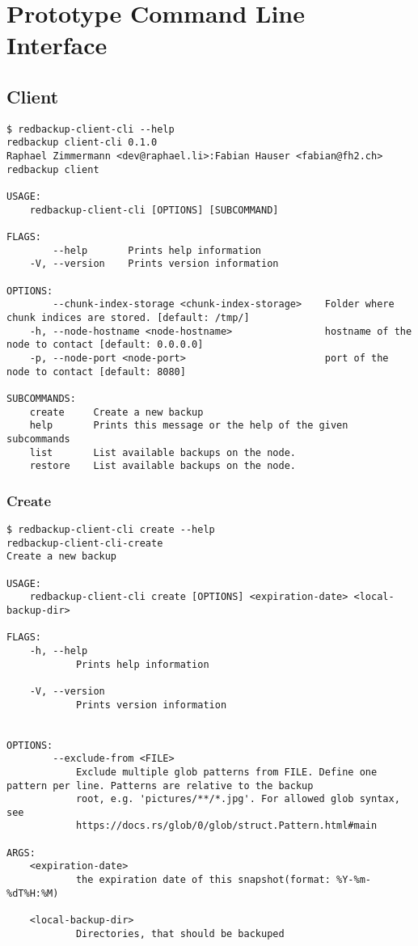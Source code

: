 
\section{Prototype Command Line Interface}\label{sec:prototype-command-line-interface}
\subsection{Client}
\begin{lstlisting}
$ redbackup-client-cli --help
redbackup client-cli 0.1.0
Raphael Zimmermann <dev@raphael.li>:Fabian Hauser <fabian@fh2.ch>
redbackup client

USAGE:
    redbackup-client-cli [OPTIONS] [SUBCOMMAND]

FLAGS:
        --help       Prints help information
    -V, --version    Prints version information

OPTIONS:
        --chunk-index-storage <chunk-index-storage>    Folder where chunk indices are stored. [default: /tmp/]
    -h, --node-hostname <node-hostname>                hostname of the node to contact [default: 0.0.0.0]
    -p, --node-port <node-port>                        port of the node to contact [default: 8080]

SUBCOMMANDS:
    create     Create a new backup
    help       Prints this message or the help of the given subcommands
    list       List available backups on the node.
    restore    List available backups on the node.
\end{lstlisting}

\subsubsection{Create}

\begin{lstlisting}
$ redbackup-client-cli create --help
redbackup-client-cli-create 
Create a new backup

USAGE:
    redbackup-client-cli create [OPTIONS] <expiration-date> <local-backup-dir>

FLAGS:
    -h, --help       
            Prints help information

    -V, --version    
            Prints version information


OPTIONS:
        --exclude-from <FILE>    
            Exclude multiple glob patterns from FILE. Define one pattern per line. Patterns are relative to the backup
            root, e.g. 'pictures/**/*.jpg'. For allowed glob syntax, see
            https://docs.rs/glob/0/glob/struct.Pattern.html#main

ARGS:
    <expiration-date>     
            the expiration date of this snapshot(format: %Y-%m-%dT%H:%M)

    <local-backup-dir>    
            Directories, that should be backuped
\end{lstlisting}

